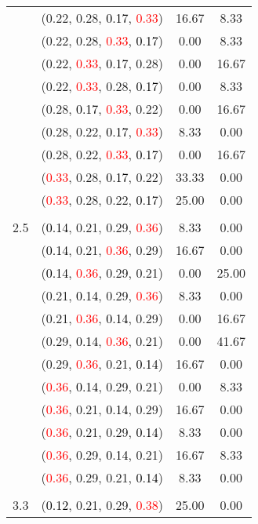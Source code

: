 \documentclass[10pt,a4paper]{report}
\begin{document}
\begin{center}
\begin{longtable}{clcc}
			&(0.22, 0.28, \textcolor{black}{0.17}, \textcolor{red}{0.33})&16.67&8.33\\
			&(0.22, 0.28, \textcolor{red}{0.33}, \textcolor{black}{0.17})&0.00&8.33\\
			&(0.22, \textcolor{red}{0.33}, \textcolor{black}{0.17}, 0.28)&0.00&16.67\\
			&(0.22, \textcolor{red}{0.33}, 0.28, \textcolor{black}{0.17})&0.00&8.33\\
			&(0.28, \textcolor{black}{0.17}, \textcolor{red}{0.33}, 0.22)&0.00&16.67\\
			&(0.28, 0.22, \textcolor{black}{0.17}, \textcolor{red}{0.33})&8.33&0.00\\
			&(0.28, 0.22, \textcolor{red}{0.33}, \textcolor{black}{0.17})&0.00&16.67\\
			&(\textcolor{red}{0.33}, 0.28, \textcolor{black}{0.17}, 0.22)&33.33&0.00\\
			&(\textcolor{red}{0.33}, 0.28, 0.22, \textcolor{black}{0.17})&25.00&0.00\\
		&&&\\
		2.5			&(\textcolor{black}{0.14}, 0.21, 0.29, \textcolor{red}{0.36})&8.33&0.00\\
			&(\textcolor{black}{0.14}, 0.21, \textcolor{red}{0.36}, 0.29)&16.67&0.00\\
			&(\textcolor{black}{0.14}, \textcolor{red}{0.36}, 0.29, 0.21)&0.00&25.00\\
			&(0.21, \textcolor{black}{0.14}, 0.29, \textcolor{red}{0.36})&8.33&0.00\\
			&(0.21, \textcolor{red}{0.36}, \textcolor{black}{0.14}, 0.29)&0.00&16.67\\
			&(0.29, \textcolor{black}{0.14}, \textcolor{red}{0.36}, 0.21)&0.00&41.67\\
			&(0.29, \textcolor{red}{0.36}, 0.21, \textcolor{black}{0.14})&16.67&0.00\\
			&(\textcolor{red}{0.36}, \textcolor{black}{0.14}, 0.29, 0.21)&0.00&8.33\\
			&(\textcolor{red}{0.36}, 0.21, \textcolor{black}{0.14}, 0.29)&16.67&0.00\\
			&(\textcolor{red}{0.36}, 0.21, 0.29, \textcolor{black}{0.14})&8.33&0.00\\
			&(\textcolor{red}{0.36}, 0.29, \textcolor{black}{0.14}, 0.21)&16.67&8.33\\
			&(\textcolor{red}{0.36}, 0.29, 0.21, \textcolor{black}{0.14})&8.33&0.00\\
		&&&\\
		3.3			&(\textcolor{black}{0.12}, 0.21, 0.29, \textcolor{red}{0.38})&25.00&0.00\\

\end{longtable}
\end{center}
\end{document}

